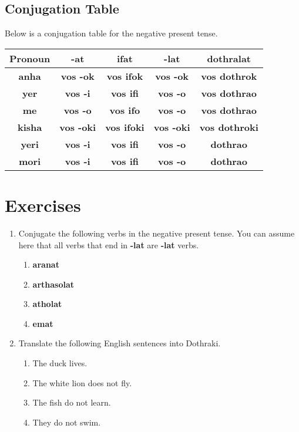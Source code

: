\subsection*{Conjugation Table}
Below is a conjugation table for the negative present tense. \\
\begin{tabular}{|c|c|c|c|c|}
		\hline
		Pronoun & \textbf{-at} & \textbf{ifat} & \textbf{-lat} & \textbf{dothralat} \\
		\hline
		\textbf{anha} & \textbf{vos -ok} & \textbf{vos ifok} & \textbf{vos -ok} & \textbf{vos dothrok} \\
		\hline
		\textbf{yer} & \textbf{vos -i} & \textbf{vos ifi} & \textbf{vos -o} & \textbf{vos dothrao} \\
		\hline
		\textbf{me} & \textbf{vos -o} & \textbf{vos ifo} & \textbf{vos -o} & \textbf{vos dothrao} \\
		\hline
		\textbf{kisha} & \textbf{vos -oki} & \textbf{vos ifoki} & \textbf{vos -oki} & \textbf{vos dothroki} \\
		\hline
		\textbf{yeri} & \textbf{vos -i} & \textbf{vos ifi} & \textbf{vos -o} & \textbf{dothrao} \\
		\hline
		\textbf{mori} & \textbf{vos -i} & \textbf{vos ifi} & \textbf{vos -o} & \textbf{dothrao} \\
		\hline
\end{tabular}
\section*{Exercises}
\begin{enumerate}
	\item Conjugate the following verbs in the negative present tense. You can assume here that all verbs that end in
				\textbf{-lat} are \textbf{-lat} verbs.
	\begin{enumerate}
		\item \textbf{aranat}
		\item \textbf{arthasolat}
		\item \textbf{atholat}
		\item \textbf{emat}
	\end{enumerate}
	\item Translate the following English sentences into Dothraki.
	\begin{enumerate}
		\item The duck lives.
		\item The white lion does not fly.
		\item The fish do not learn.
		\item They do not swim.
	\end{enumerate}
\end{enumerate}
